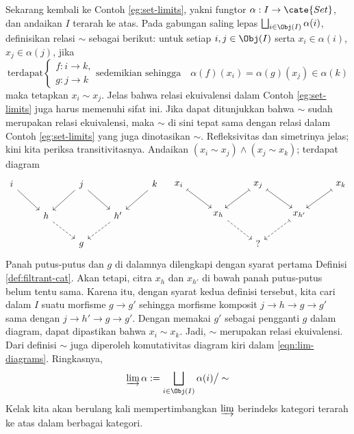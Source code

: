 Sekarang kembali ke Contoh \ref{eg:set-limits}, yakni fungtor $\alpha: I \to \cate{Set}$, dan andaikan $I$ terarah ke atas. Pada gabungan saling lepas $\bigsqcup_{i \in \Obj(I)} \alpha(i)$, definisikan relasi $\sim$ sebagai berikut: untuk setiap $i, j \in \Obj(I)$ serta $x_i \in \alpha(i)$, $x_j \in \alpha(j)$, jika
\begin{equation}\label{eqn:filtrant-equiv} \text{terdapat} \begin{cases}
	f: i \to k, \\
	g: j \to k
	\end{cases}
	\text{sedemikian sehingga} \quad \alpha(f)(x_i) = \alpha(g)(x_j) \in \alpha(k)
\end{equation}
maka tetapkan $x_i \sim x_j$. Jelas bahwa relasi ekuivalensi dalam Contoh \ref{eg:set-limits} juga harus memenuhi sifat ini. Jika dapat ditunjukkan bahwa $\sim$ sudah merupakan relasi ekuivalensi, maka $\sim$ di sini tepat sama dengan relasi dalam Contoh \ref{eg:set-limits} yang juga dinotasikan $\sim$. Refleksivitas dan simetrinya jelas; kini kita periksa transitivitasnya. Andaikan $(x_i \sim x_j) \wedge (x_j \sim x_k)$; terdapat diagram
\[ \begin{tikzcd}[scale=0.75]
	i \arrow[rd] & & j \arrow[ld] \arrow[rd] & & k \arrow[ld] \\
	& h \arrow[dashed, rd] & & h' \arrow[dashed, ld] & \\
	& & g & &
\end{tikzcd} \quad \begin{tikzcd}[scale=0.75]
	x_i \arrow[mapsto, rd] & & x_j \arrow[mapsto, ld] \arrow[mapsto, rd] & & x_k \arrow[mapsto, ld] \\
	& x_h \arrow[dashed, rd] & & x_{h'} \arrow[dashed, mapsto, ld] & \\
	& & ? & & 
\end{tikzcd} \]
Panah putus-putus dan $g$ di dalamnya dilengkapi dengan syarat pertama Definisi \ref{def:filtrant-cat}. Akan tetapi, citra $x_h$ dan $x_{h'}$ di bawah panah putus-putus belum tentu sama. Karena itu, dengan syarat kedua definisi tersebut, kita cari dalam $I$ suatu morfisme $g \to g'$ sehingga morfisme komposit $j \to h \to g \to g'$ sama dengan $j \to h' \to g \to g'$. Dengan memakai $g'$ sebagai pengganti $g$ dalam diagram, dapat dipastikan bahwa $x_i \sim x_k$. Jadi, $\sim$ merupakan relasi ekuivalensi. Dari definisi $\sim$ juga diperoleh komutativitas diagram kiri dalam \eqref{eqn:lim-diagrams}. Ringkasnya,
\[ \varinjlim \alpha := \bigsqcup_{i \in \Obj(I)} \alpha(i) \big/ \sim \]
Kelak kita akan berulang kali mempertimbangkan $\varinjlim$ berindeks kategori terarah ke atas dalam berbagai kategori.

